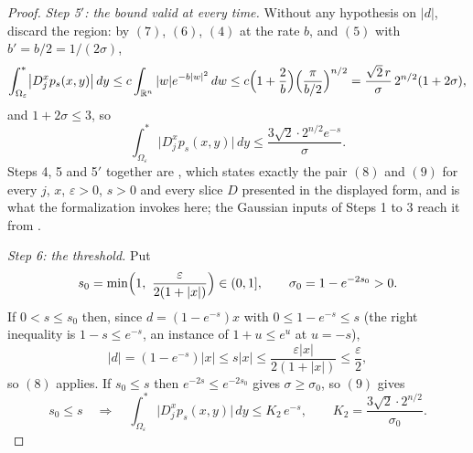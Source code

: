 \begin{proof}
\emph{Step 5$'$: the bound valid at every time.}
Without any hypothesis on $|d|$, discard the region: by $(7)$, $(6)$, $(4)$ at
the rate $b$, and $(5)$ with $b' = b/2 = 1/(2\sigma)$,
\[
  \int^*_{\Omega_\varepsilon}\bigl|D_j^xp_s(x,y)\bigr|\,dy
    \leq c\int_{\mathbb{R}^n}|w|e^{-b|w|^2}\,dw
    \leq c\Bigl(1+\frac2b\Bigr)\Bigl(\frac{\pi}{b/2}\Bigr)^{n/2}
    = \frac{\sqrt2\,r}{\sigma}\,2^{n/2}(1+2\sigma) ,
\]
and $1+2\sigma \leq 3$, so
\begin{equation*}
  \int^*_{\Omega_\varepsilon}\bigl|D_j^xp_s(x,y)\bigr|\,dy
    \leq \frac{3\sqrt2\cdot2^{n/2}e^{-s}}{\sigma} .
  \tag{9}
\end{equation*}
Steps 4, 5 and 5$'$ together are , which states
exactly the pair $(8)$ and $(9)$ for every $j$, $x$, $\varepsilon > 0$, $s > 0$ and every
slice $D$ presented in the displayed form, and is what the formalization invokes here;
the Gaussian inputs of Steps 1 to 3 reach it from .

\emph{Step 6: the threshold.}
Put
\[
  s_0 = \min\Bigl(1,\ \frac{\varepsilon}{2(1+|x|)}\Bigr) \in (0,1] ,
  \qquad
  \sigma_0 = 1-e^{-2s_0} > 0 .
\]
If $0 < s \leq s_0$ then, since $d = (1-e^{-s})x$ with
$0 \leq 1-e^{-s} \leq s$ (the right inequality is $1-s \leq e^{-s}$, an instance
of $1+u \leq e^u$ at $u = -s$),
\[
  |d| = (1-e^{-s})|x| \leq s|x|
    \leq \frac{\varepsilon|x|}{2(1+|x|)} \leq \frac\varepsilon2 ,
\]
so $(8)$ applies.  If $s_0 \leq s$ then $e^{-2s} \leq e^{-2s_0}$ gives
$\sigma \geq \sigma_0$, so $(9)$ gives
\begin{equation*}
  s_0 \leq s
  \quad\Longrightarrow\quad
  \int^*_{\Omega_\varepsilon}\bigl|D_j^xp_s(x,y)\bigr|\,dy
    \leq K_2\,e^{-s} ,
  \qquad
  K_2 = \frac{3\sqrt2\cdot2^{n/2}}{\sigma_0} .
  \tag{10}
\end{equation*}


\end{proof}
